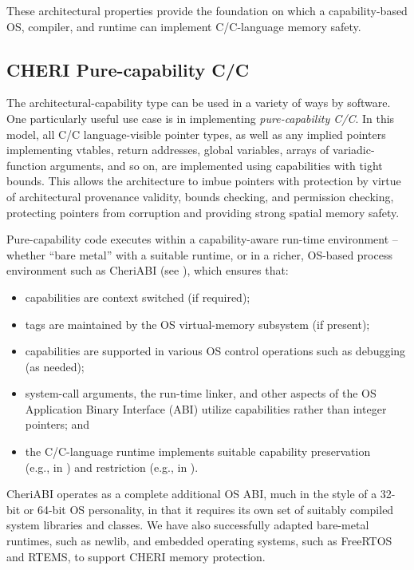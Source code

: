 \documentclass[12pt,twoside,openright,usletter]{article}
\newcommand{\ccode}[1]{{\small\ttfamily{#1}}}
\newcommand{\cfunc}[1]{{\ccode{#1()}}}
\newcommand{\note}[2]{{\color{blue}[ Note: #1 - #2]}}
\renewcommand{\note}[2]{\relax\ifhmode\unskip\fi}
\newcommand{\psnote}[1]{\note{#1}{Peter S.}}
\newcommand*{\cpp}[1][]{C\textsmaller[2]{\nolinebreak[4]\hspace{-.05em}\raisebox{.45ex}{\textbf{++}}}}
\newcommand*{\cppInHeader}[1][]{\texorpdfstring{\cpp{}}{C++}}
\begin{document}
These architectural properties provide the foundation on which a
capability-based OS, compiler, and runtime can implement C/\cpp{}-language memory
safety.

\psnote{Add:   They have been made precise and have been proved, with machine-checked proof, to hold for the CHERI-MIPS architecture~\cite{cheri-formal-SP2020}.}


\subsection{CHERI Pure-capability C/\cppInHeader{}}

The architectural-capability type can be used in a variety of ways by
software.
One particularly useful use case is in implementing \textit{pure-capability
C/\cpp{}}.
In this model, all C/\cpp{} language-visible pointer types, as well as any
implied pointers implementing vtables, return addresses, global variables,
arrays of variadic-function arguments, and so on, are implemented using
capabilities with tight bounds.
This allows the architecture to imbue pointers with protection by virtue of
architectural provenance validity, bounds checking, and permission checking,
protecting pointers from corruption and providing strong spatial memory
safety.

Pure-capability code executes within a capability-aware run-time environment
-- whether ``bare metal'' with a suitable runtime, or in a richer, OS-based
process environment such as CheriABI (see ),
which ensures that:
\begin{itemize}
  \item capabilities are context switched (if required);
  \item tags are maintained by the OS virtual-memory subsystem (if present);
  \item capabilities are supported in various OS control operations such as
    debugging (as needed);
  \item system-call arguments, the
run-time linker, and other aspects of the OS Application Binary Interface
(ABI) utilize capabilities rather than integer pointers; and
  \item the C/\cpp{}-language runtime implements suitable capability preservation
    \\
    (e.g., in \cfunc{memcpy}) and restriction (e.g., in \cfunc{malloc}).
\end{itemize}
CheriABI operates as a complete additional OS ABI, much in the style of a
32-bit or 64-bit OS personality, in that it requires its own set of suitably
compiled system libraries and classes.
We have also successfully adapted bare-metal runtimes, such as newlib, and
embedded operating systems, such as FreeRTOS and RTEMS, to support CHERI
memory protection.
\end{document}
